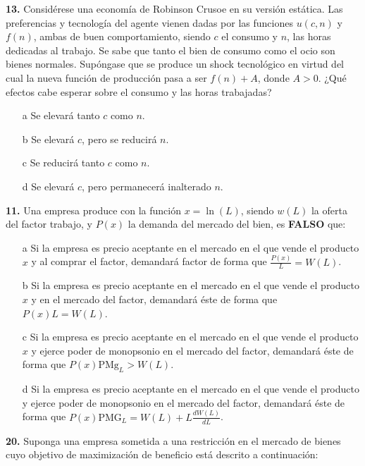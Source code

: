 \documentclass{nuevotema}
\begin{document}

\textbf{13.} Considérese una economía de Robinson Crusoe en su versión estática. Las preferencias y tecnología del agente vienen dadas por las funciones $u(c,n)$ y $f(n)$, ambas de buen comportamiento, siendo $c$ el consumo y $n$, las horas dedicadas al trabajo. Se sabe que tanto el bien de consumo como el ocio son bienes normales. Supóngase que se produce un shock tecnológico en virtud del cual la nueva función de producción pasa a ser $f(n) + A$, donde $A > 0$. ¿Qué efectos cabe esperar sobre el consumo y las horas trabajadas?
\begin{enumerate}
	\item[a] Se elevará tanto $c$ como $n$.
	\item[b] Se elevará $c$, pero se reducirá $n$.
	\item[c] Se reducirá tanto $c$ como $n$.
	\item[d] Se elevará $c$, pero permanecerá inalterado $n$.
\end{enumerate}



\textbf{11.} Una empresa produce con la función $x=\ln (L)$, siendo $w(L)$ la oferta del factor trabajo, y $P(x)$ la demanda del mercado del bien, es \textbf{FALSO} que:
\begin{enumerate}
	\item[a] Si la empresa es precio aceptante en el mercado en el que vende el producto $x$ y al comprar el factor, demandará factor de forma que $\frac{P(x)}{L} = W(L)$.
	\item[b] Si la empresa es precio aceptante en el mercado en el que vende el producto $x$ y en el mercado del factor, demandará éste de forma que $P(x) L = W(L)$. 
	\item[c] Si la empresa es precio aceptante en el mercado en el que vende el producto $x$ y ejerce poder de monopsonio en el mercado del factor, demandará éste de forma que $P(x) \text{PMg}_L > W(L)$.
	\item[d] Si la empresa es precio aceptante en el mercado en el que vende el producto y ejerce poder de monopsonio en el mercado del factor, demandará éste de forma que $P(x) \text{PMG}_L = W(L) + L \frac{dW(L)}{dL}$.
\end{enumerate}


\textbf{20.} Suponga una empresa sometida a una restricción en el mercado de bienes cuyo objetivo de maximización de beneficio está descrito a continuación:
\end{document}
